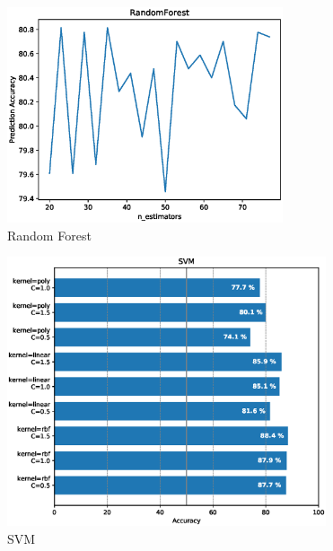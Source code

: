 \documentclass[10pt,journal,compsoc]{IEEEtran}
\begin{document}
\begin{figure}[!h]
	\centering
	\includegraphics[width=3.2in]{./img/RandomForest.eps}
	\caption{Random Forest}
	\label{RandomForest}
\end{figure}
\begin{figure}[!h]
	\centering
	\includegraphics[width=3.7in]{./img/SVM.eps}
	\caption{SVM}
	\label{SVM}
\end{figure}
\end{document}
